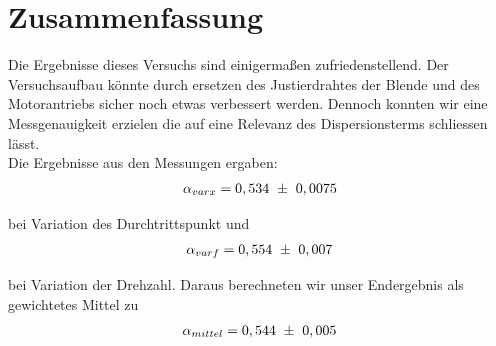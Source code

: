\documentclass[12pt]{article}
\begin{document}
\section{Zusammenfassung}
Die Ergebnisse dieses Versuchs sind einigermaßen zufriedenstellend. Der Versuchsaufbau könnte durch ersetzen des Justierdrahtes der Blende und des Motorantriebs sicher noch etwas verbessert werden. Dennoch konnten wir eine Messgenauigkeit erzielen die auf eine Relevanz des Dispersionsterms schliessen lässt.
\\
Die Ergebnisse aus den Messungen ergaben:
\begin{align}
\notag
 \alpha_{varx} = 0,534 \ \pm \ 0,0075
\end{align}

bei Variation des Durchtrittspunkt und
\begin{align}
\notag
 \alpha_{varf} = 0,554 \ \pm \ 0,007
\end{align}

bei Variation der Drehzahl. Daraus berechneten wir unser Endergebnis als gewichtetes Mittel zu
\begin{align}
\notag
 \alpha_{mittel} = 0,544 \ \pm \ 0,005
\end{align}
\end{document}

